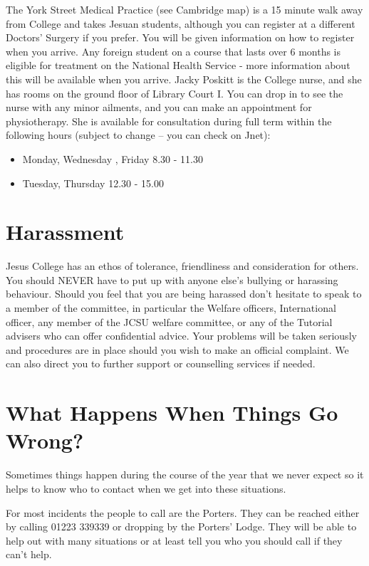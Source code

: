 \documentclass[11pt,fleqn, oneside]{book} %
\begin{document}
The York Street Medical Practice (see Cambridge map) is a 15 minute walk away from College and takes Jesuan students, although you can register at a different Doctors’ Surgery if you prefer.  You will be given information on how to register when you arrive.  Any foreign student on a course that lasts over 6 months is eligible for treatment on the National Health Service - more information about this will be available when you arrive.  
Jacky Poskitt is the College nurse, and she has rooms on the ground floor of Library Court I.  You can drop in to see the nurse with any minor ailments, and you can make an appointment for physiotherapy. She is available for consultation during full term within the following hours (subject to change – you can check on Jnet):
   \begin{itemize}
 \item	Monday, Wednesday , Friday 	8.30 - 11.30
\item	Tuesday, Thursday	 	12.30 - 15.00
   
   \end{itemize}

   
\section{Harassment}
   
Jesus College has an ethos of tolerance, friendliness and consideration for others. You should NEVER have to put up with anyone else’s bullying or harassing behaviour. Should you feel that you are being harassed don’t hesitate to speak to a member of the committee, in particular the Welfare officers, International officer, any member of the JCSU welfare committee, or any of the Tutorial advisers who can offer confidential advice. Your problems will be taken seriously and procedures are in place should you wish to make an official complaint. We can also direct you to further support or counselling services if needed.
   
\section{What Happens When Things Go Wrong?}
Sometimes things happen during the course of the year that we never expect so it helps to know who to contact when we get into these situations.
   
For most incidents the people to call are the Porters. They can be reached either by calling 01223 339339 or dropping by the Porters’ Lodge. They will be able to help out with many situations or at least tell you who you should call if they can’t help.
   
\end{document}

